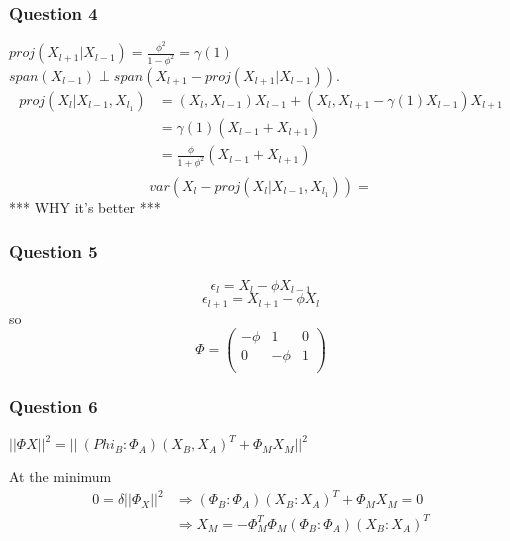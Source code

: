 \documentclass{article}
\newcommand{\Q}[1]{\subsubsection*{Question #1}}
\begin{document}
\Q{4}
$proj(X_{l+1}|X_{l-1}) = \frac{\phi^2}{1-\phi^2} = \gamma(1)$
$span(X_{l-1}) \perp span(X_{l+1}-proj(X_{l+1}|X_{l-1}))$.
\begin{align*}
  proj(X_l|X_{l-1}, X_{l_1}) &= (X_l, X_{l-1}) X_{l-1} + (X_l, X_{l+1}-\gamma(1)X_{l-1})  X_{l+1} \\
                             &= \gamma(1) (X_{l-1} + X_{l+1}) \\
                             &= \frac{\phi}{1+\phi^2}(X_{l-1} + X_{l+1})\\
\end{align*}
$$var(X_l - proj(X_l|X_{l-1}, X_{l_1})) = $$
*** WHY it's better ***
\Q{5}
$$\epsilon_l = X_l - \phi X_{l-1}$$
$$\epsilon_{l+1} = X_{l+1} - \phi X_l$$
so
$$\Phi = 
\left(
  \begin{array}{ccc}
    -\phi & 1 & 0 \\
    0 & -\phi & 1 \\
  \end{array}
  \right)
$$



\Q{6}
$||\Phi X||^2 = ||\ (Phi_B : \Phi_A) (X_B , X_A)^T + \Phi_M X_M||^2$

At the minimum
\begin{align*}
  0 = \delta ||\Phi_X||^2 &\Rightarrow (\Phi_B : \Phi_A) (X_B : X_A)^T + \Phi_M X_M = 0 \\
  &\Rightarrow X_M = -\Phi_M^T \Phi_M (\Phi_B : \Phi_A) (X_B : X_A)^T
\end{align*}
\end{document}
